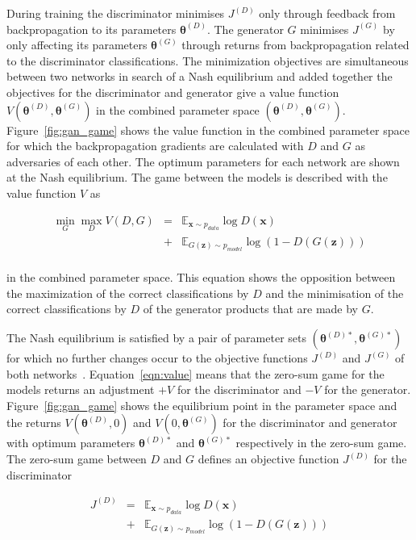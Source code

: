 \documentclass[twocolumn]{article}
\numberwithin{equation}{section}
\begin{document}
During training the discriminator minimises $J^{(D)}$ only through feedback from backpropagation to its parameters 
$\bm{\theta}^{(D)}$. The generator $G$ minimises $J^{(G)}$ by only affecting its parameters $\bm{\theta}^{(G)}$ through 
returns from backpropagation related to the discriminator classifications. The minimization objectives are simultaneous 
between two networks in search of a Nash equilibrium and added together the objectives for the discriminator and generator 
give a value function $V(\bm{\theta}^{(D)}, \bm{\theta}^{(G)})$ in the combined parameter space $(\bm{\theta}^{(D)}, 
\bm{\theta}^{(G)})$. Figure~\ref{fig:gan_game} shows the value function in the combined parameter space for which the 
backpropagation gradients are calculated with $D$ and $G$ as adversaries of each other. The optimum parameters for each 
network are shown at the Nash equilibrium. The game between the models is described with the value function $V$ as 

\begin{eqnarray}\label{eqn:value}
    \min_G \max_D V(D,G) &=& \mathbb{E}_{\mathbf{x}\sim p_{data}}\log D(\mathbf{x})            \nonumber \\
                         &+& \mathbb{E}_{G(\mathbf{z}) \sim p_{model}}\log(1-D(G(\mathbf{z}))) \nonumber \\
\end{eqnarray}

in the combined parameter space. This equation shows the opposition between the maximization of the correct 
classifications by $D$ and the minimisation of the correct classifications by $D$ of the generator products that are 
made by $G$. 

The Nash equilibrium is satisfied by a pair of parameter sets $(\bm{\theta}^{(D)*}, \bm{\theta}^{(G)*})$ for which 
no further changes occur to the objective functions $J^{(D)}$ and $J^{(G)}$ of both networks~\cite{NIPS16}. 
Equation~\ref{eqn:value} means that the zero-sum game for the models returns an adjustment $+V$ for the discriminator 
and $-V$ for the generator. Figure~\ref{fig:gan_game} shows the equilibrium point in the parameter space and the 
returns $V(\bm{\theta}^{(D)}, 0)$ and $V(0, \bm{\theta}^{(G)})$ for the discriminator and generator with optimum 
parameters $\bm{\theta}^{(D)*}$ and $\bm{\theta}^{(G)*}$ respectively in the zero-sum game. The zero-sum game between 
$D$ and $G$ defines an objective function $J^{(D)}$ for the discriminator

\begin{eqnarray}\label{eq:J_D}
    J^{(D)} &=& \mathbb{E}_{\mathbf{x} \sim p_{data}}\log D(\mathbf{x})  \nonumber \\
            &+&\mathbb{E}_{G(\mathbf{z}) \sim p_{model}}\log (1 - D(G(\mathbf{z})))
\end{eqnarray}
\end{document}

